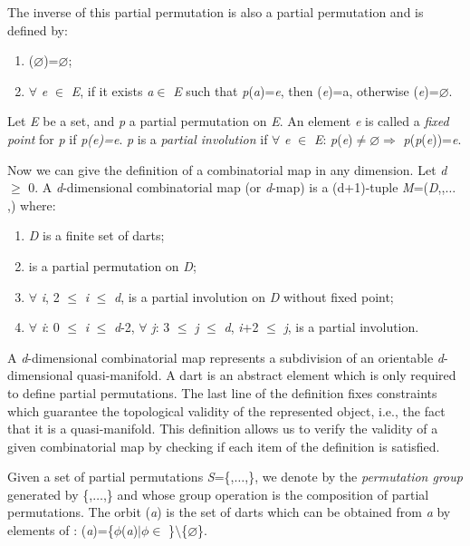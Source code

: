 The inverse \pmun{} of this partial permutation is also a partial
permutation and is defined by:
\begin{enumerate}
\item \pmun{}($\varnothing$)=$\varnothing$;
\item $\forall$ \emph{e} $\in$ \emph{E}, if it exists \emph{a}$\in$ \emph{E} such that \emph{p}(\emph{a})=\emph{e},
  then \pmun{}(\emph{e})=a, otherwise \pmun{}(\emph{e})=$\varnothing$.
\end{enumerate}

Let \emph{E} be a set, and \emph{p} a partial permutation on \emph{E}.  An element
\emph{e} is called a \emph{fixed point} for \emph{p} if \emph{p(e)=e}.  \emph{p} is a
\emph{partial involution} if $\forall$ \emph{e} $\in$ \emph{E}: \emph{p}(\emph{e})$\neq \varnothing
\Rightarrow$ \emph{p}(\emph{p}(\emph{e}))=\emph{e}.

Now we can give the definition of a combinatorial map in any dimension.
Let \emph{d} $\geq$ 0. A \emph{d}-dimensional combinatorial map (or 
\emph{d}-map) is a (d+1)-tuple \emph{M}=(\emph{D},\betaun{},$\ldots$,\betad{}) 
where:
\begin{enumerate}
\item \emph{D} is a finite set of darts;
\item \betaun{} is a partial permutation on \emph{D};
\item $\forall$ \emph{i}, 2 $\leq$ \emph{i} $\leq$ \emph{d}, \betai{} is a
  partial involution on \emph{D} without fixed point;
\item\label{cond-composition} $\forall$ \emph{i}: 0 $\leq$ \emph{i} $\leq$ \emph{d}-2,
  $\forall$ \emph{j}: 3 $\leq$ \emph{j} $\leq$ \emph{d}, \emph{i}+2 $\leq$ \emph{j},
  \betai{}\comp{}\betaj{} is a partial involution.
\end{enumerate}

A \emph{d}-dimensional combinatorial map represents a subdivision of an
orientable \emph{d}-dimensional quasi-manifold. A dart is an abstract element
which is only required to define partial permutations. The last line of
the definition fixes constraints which guarantee the topological
validity of the represented object, i.e., the fact that it is a
quasi-manifold. This definition allows us to verify the validity of a
given combinatorial map by checking if each item of the definition is
satisfied.

Given a set of partial permutations \emph{S}=\{,$\ldots$,\}, we denote by  the \emph{permutation group} generated by
\{,$\ldots$,\} and whose group operation is the composition of
partial permutations.  The orbit (\emph{a}) is the set of darts which can be obtained from \emph{a} by elements of :
(\emph{a})=\{$\phi$(\emph{a})$|\phi \in$ \}$\setminus$\{$\varnothing$\}.

